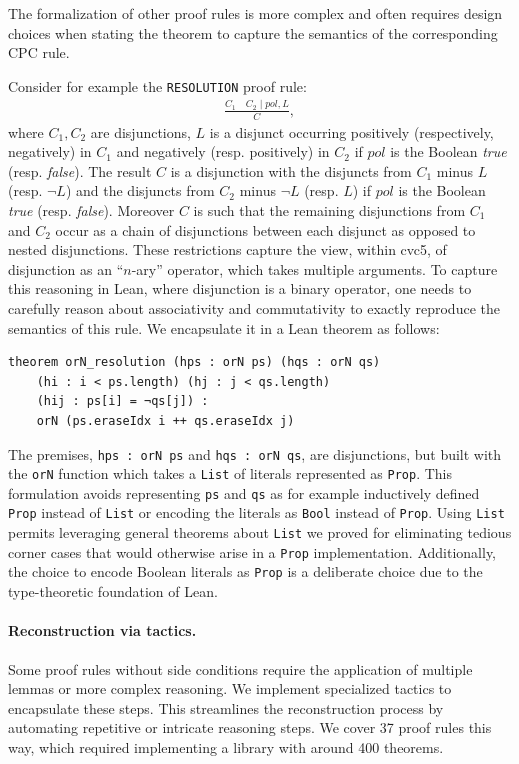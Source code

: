 \documentclass[runningheads]{llncs}
\begin{document}
The formalization of other proof rules is more complex and often requires design
choices when stating the theorem to capture the semantics of the corresponding
CPC rule.
%
\begin{example}
Consider for example the \texttt{RESOLUTION} proof rule:
\begin{align*}
    \frac{C_1 \quad C_2 \mid pol, L}{C},
\end{align*}
where $C_1, C_2$ are disjunctions, $L$ is a disjunct occurring positively
(respectively, negatively) in $C_1$ and negatively (resp. positively) in $C_2$
if $pol$ is the Boolean \emph{true} (resp. \emph{false}).
%
The result $C$ is a disjunction with the disjuncts from $C_1$ minus $L$
(resp. $\neg L$) and the disjuncts from $C_2$ minus $\neg L$ (resp. $L$) if
$pol$ is the Boolean \emph{true} (resp. \emph{false}).
%
Moreover $C$ is such that the remaining disjunctions from $C_1$ and $C_2$ occur
as a chain of disjunctions between each disjunct as opposed to nested disjunctions.
%
These restrictions capture the view, within cvc5, of disjunction as an
``$n$-ary'' operator, which takes multiple arguments.
%
To capture this reasoning in Lean, where disjunction is a binary operator, one
needs to carefully reason about associativity and commutativity to exactly
reproduce the semantics of this rule. We encapsulate it in a Lean theorem as follows:
\begin{lstlisting}
theorem orN_resolution (hps : orN ps) (hqs : orN qs)
    (hi : i < ps.length) (hj : j < qs.length)
    (hij : ps[i] = ¬qs[j]) :
    orN (ps.eraseIdx i ++ qs.eraseIdx j)
\end{lstlisting}

The premises, \lstinline{hps : orN ps} and \lstinline{hqs : orN qs}, are
disjunctions, but built with the \lstinline{orN} function which takes
a \lstinline{List} of literals represented as \lstinline{Prop}.
%
This formulation avoids representing \lstinline{ps} and \lstinline{qs} as for
example inductively defined \lstinline{Prop} instead of \lstinline{List} or
encoding the literals as \lstinline{Bool} instead of \lstinline{Prop}.
%
Using \lstinline{List} permits leveraging general theorems
about \lstinline{List} we proved for eliminating tedious corner cases that would
otherwise arise in a \lstinline{Prop} implementation.
%
Additionally, the choice to encode Boolean literals as \lstinline{Prop} is a
deliberate choice due to the type-theoretic foundation of Lean.
\end{example}
%

\paragraph{Reconstruction via tactics.} Some proof rules without side
conditions require the application of multiple lemmas or more complex reasoning.
%
We implement specialized tactics to encapsulate these steps. This streamlines
the reconstruction process by automating repetitive or intricate reasoning
steps. We cover 37 proof rules this way, which required implementing a
library with around 400 theorems.
\end{document}
